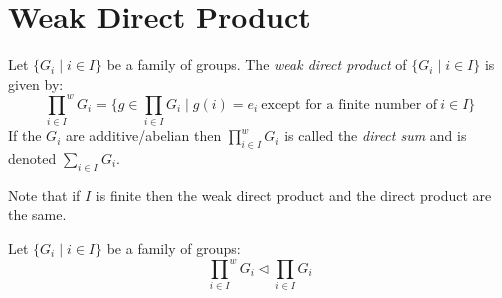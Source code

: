 \documentclass[letterpaper,12pt,fleqn]{article}
\newcommand{\gfam}{\{G_i\mid i\in I\}}
\newcommand{\direct}{\prod_{i\in I}G_i}
\newcommand{\iweak}{\prod_{i\in I}^wG_i}
\newcommand{\weak}{{\prod_{i\in I}}^wG_i}
\newcommand{\n}{\triangleleft}
\begin{document}
\section*{Weak Direct Product}

\begin{definition}
  Let $\gfam$ be a family of groups. The \emph{weak direct product} of
  $\gfam$ is given by:
  \[\weak=\{g\in\direct\mid g(i)=e_i
  \ \mbox{except for a finite number of}\ i\in I\}\]
  If the $G_i$ are additive/abelian then $\iweak$ is called the
  \emph{direct sum} and is denoted $\sum_{i\in I}G_i$.
\end{definition}

Note that if $I$ is finite then the weak direct product and the direct product
are the same.

\begin{theorem}
  Let $\gfam$ be a family of groups:
  \[\weak\n\direct\]
\end{theorem}
\end{document}
